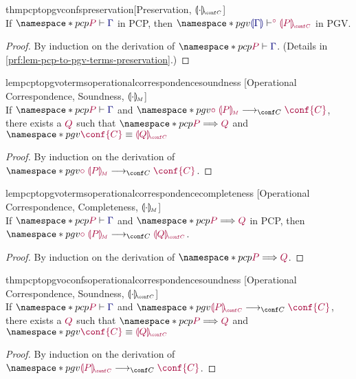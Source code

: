 \documentclass[main.tex]{subfiles}
\begin{document}
\begin{restatabletheorem}{thmpcptopgvconfspreservation}[Preservation, $\cpgvC{\cdot}$]
  \label{thm:pcp-to-pgv-confs-preservation}
  \hfill\\%
  If $\pcp{\seq{P}{\ty{\Gamma}}}$ in PCP,
  then $\pgv{\cseq[\child]{\ty{\cpgvT{\Gamma}}}{\cpgvC{P}}}$ in PGV.
\end{restatabletheorem}
\begin{proof}
  By induction on the derivation of $\pcp{\seq{P}{\ty{\Gamma}}}$.
  (Details in \cref{prf:lem-pcp-to-pgv-terms-preservation}.)
\end{proof}

\begin{restatablelemma}{lempcptopgvotermsoperationalcorrespondencesoundness}%
  [Operational Correspondence, Soundness, $\llparenthesis\cdot\rrparenthesis_{\!\scriptscriptstyle{M}}$]
  \label{lem:pcp-to-pgv-terms-operational-correspondence-soundness}
  \hfill\\%
  If $\pcp{\seq{P}{\ty{\Gamma}}}$ and $\pgv{\tm{\child\;\cpgvM{P}}\cred\tm{\conf{C}}}$,
  there exists a $\tm{Q}$ such that $\pcp{\tm{P}\red\tm{Q}}$ and $\pgv{\tm{\conf{C}}\equiv\tm{\cpgvC{Q}}}$
\end{restatablelemma}
\begin{proof}
  By induction on the derivation of $\pgv{\tm{\child\;\cpgvM{P}}\cred\tm{\conf{C}}}$.
\end{proof}

\begin{restatablelemma}{lempcptopgvotermsoperationalcorrespondencecompleteness}%
  [Operational Correspondence, Completeness, $\llparenthesis\cdot\rrparenthesis_{\!\scriptscriptstyle{M}}$]
  \label{lem:pcp-to-pgv-terms-operational-correspondence-completeness}
  \hfill\\%
  If $\pcp{\seq{P}{\ty{\Gamma}}}$ and $\pcp{\tm{P}\red\tm{Q}}$ in PCP,
  then $\pgv{\tm{\child\;\cpgvM{P}}\cred\tm{\cpgvC{Q}}}$.
\end{restatablelemma}
\begin{proof}
  By induction on the derivation of $\pcp{\tm{P}\red\tm{Q}}$.
\end{proof}

\begin{restatabletheorem}{thmpcptopgvoconfsoperationalcorrespondencesoundness}%
  [Operational Correspondence, Soundness, $\cpgvC{\cdot}$]
  \label{thm:pcp-to-pgv-confs-operational-correspondence-soundness}
  \hfill\\%
  If $\pcp{\seq{P}{\ty{\Gamma}}}$ and $\pgv{\tm{\cpgvC{P}}\cred\tm{\conf{C}}}$,
  there exists a $\tm{Q}$ such that $\pcp{\tm{P}\red\tm{Q}}$ and $\pgv{\tm{\conf{C}}\equiv\tm{\cpgvC{Q}}}$
\end{restatabletheorem}
\begin{proof}
  By induction on the derivation of $\pgv{\tm{\cpgvC{P}}\cred\tm{\conf{C}}}$.
\end{proof}
\end{document}
